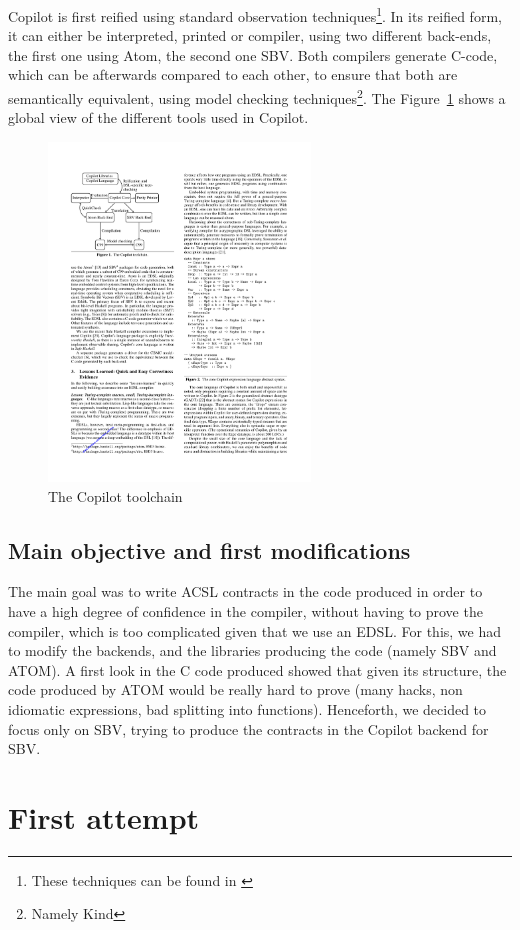 \documentclass[a4paper,11pt,final]{article}
\begin{document}
  Copilot is first reified using standard observation techniques\footnote{These techniques can be found in \cite{Copilot06}}. In its reified form, it can either be interpreted, printed or compiler, using two different back-ends, the first one using Atom, the second one SBV. Both compilers generate C-code, which can be afterwards compared to each other, to ensure that both are semantically equivalent, using model checking techniques\footnote{Namely Kind}. The Figure~\ref{fig:Copilot backend} shows a global view of the different tools used in Copilot.
  \begin{figure}[t]
  	\centering
  	\includegraphics[height=90mm,page=1]{Papiers/schema.pdf}
  	\caption{The Copilot toolchain\cite{Copilot03}}
  	\label{fig:Copilot backend}
  \end{figure}
  
  \subsection{Main objective and first modifications}
  The main goal was to write ACSL contracts in the code produced in order to have a high degree of confidence in the compiler, without having to prove the compiler, which is too complicated given that we use an EDSL. For this, we had to modify the backends, and the libraries producing the code (namely SBV and ATOM). A first look in the C code produced showed that given its structure, the code produced by ATOM would be really hard to prove (many hacks, non idiomatic expressions, bad splitting into functions). Henceforth, we decided to focus only on SBV, trying to produce the contracts in the Copilot backend for SBV.
  
  \section{First attempt}
\end{document}
